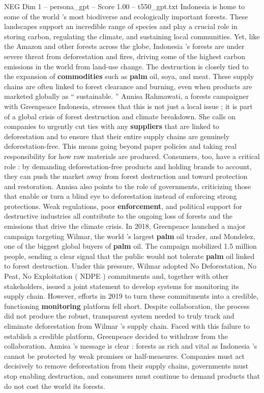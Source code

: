 \begin{textsample}{NEG Dim 1 – persona\_gpt – Score 1.00 – t550\_gpt.txt}  \label{ex:f1_neg_039}
Indonesia is home to some of the world ’s most biodiverse and ecologically important forests.
These landscapes support an incredible range of species and play a crucial role in storing carbon, regulating the climate, and sustaining local communities.
Yet, like the Amazon and other forests across the globe, Indonesia ’s forests are under severe threat from deforestation and fires, driving some of the highest carbon emissions in the world from land-use change.
The destruction is closely tied to the expansion of \textbf{commodities} such as \textbf{palm} oil, soya, and meat.
These supply chains are often linked to forest clearance and burning, even when products are marketed globally as “ sustainable. ” Annisa Rahmawati, a forests campaigner with Greenpeace Indonesia, stresses that this is not just a local issue ; it is part of a global crisis of forest destruction and climate breakdown.
She calls on companies to urgently cut ties with any \textbf{suppliers} that are linked to deforestation and to ensure that their entire supply chains are genuinely deforestation-free.
This means going beyond paper policies and taking real responsibility for how raw materials are produced.
Consumers, too, have a critical role : by demanding deforestation-free products and holding brands to account, they can push the market away from forest destruction and toward protection and restoration.
Annisa also points to the role of governments, criticizing those that enable or turn a blind eye to deforestation instead of enforcing strong protections.
Weak regulations, poor \textbf{enforcement}, and political support for destructive industries all contribute to the ongoing loss of forests and the emissions that drive the climate crisis.
In 2018, Greenpeace launched a major campaign targeting Wilmar, the world ’s largest \textbf{palm} oil trader, and Mondelez, one of the biggest global buyers of \textbf{palm} oil.
The campaign mobilized 1.5 million people, sending a clear signal that the public would not tolerate \textbf{palm} oil linked to forest destruction.
Under this pressure, Wilmar adopted No Deforestation, No Peat, No Exploitation ( NDPE ) commitments and, together with other stakeholders, issued a joint statement to develop systems for monitoring its supply chain.
However, efforts in 2019 to turn these commitments into a credible, functioning \textbf{monitoring} platform fell short.
Despite collaboration, the process did not produce the robust, transparent system needed to truly track and eliminate deforestation from Wilmar ’s supply chain.
Faced with this failure to establish a credible platform, Greenpeace decided to withdraw from the collaboration.
Annisa ’s message is clear : forests as rich and vital as Indonesia ’s cannot be protected by weak promises or half-measures.
Companies must act decisively to remove deforestation from their supply chains, governments must stop enabling destruction, and consumers must continue to demand products that do not cost the world its forests.

\end{textsample}
